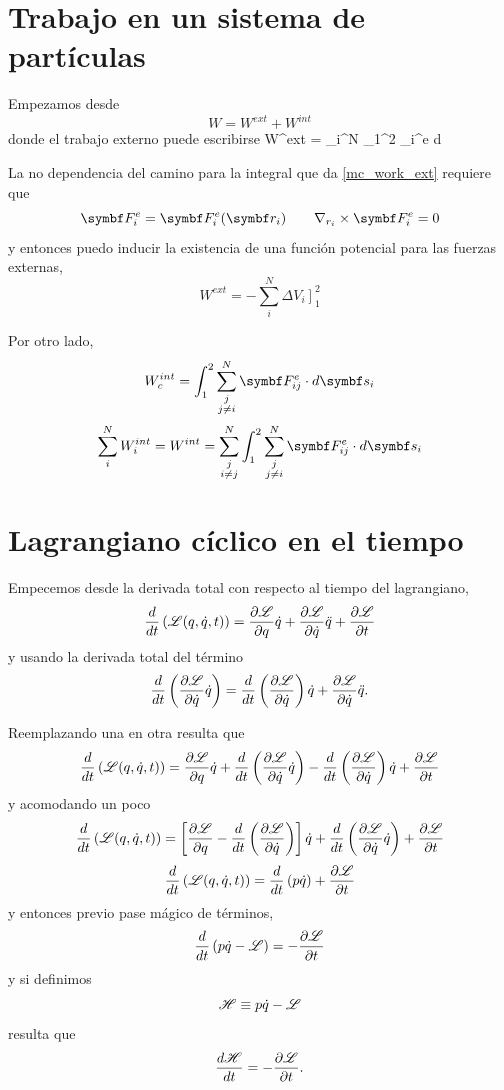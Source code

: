 \documentclass[10pt,oneside]{CBFT_book}
\begin{document}
\section{Trabajo en un sistema de partículas}

Empezamos desde
\[
	W = W^{ext} + W^{int}
\]
donde el trabajo externo puede escribirse
\be
	W^{ext} = \sum_i^N \int_1^2 _i^e \cdot d
\label{mc_work_ext}
\ee

La no dependencia del camino para la integral que da \eqref{mc_work_ext} requiere que 
\[
	\vb{F}_i^e = \vb{F}_i^e( \vb{r}_i ) \qquad \nabla_{r_i} \times \vb{F}_i^e = 0
\]
y entonces puedo inducir la existencia de una función potencial para las fuerzas externas,
\[
	W^{ext} = - \sum_i^N  \left. \Delta V_i \right]_1^2 
\]

Por otro lado,
\[
	W^{int}_c = \int_1^2 \sum_{\substack{j\\j\neq i}}^N  \vb{F}_{ij}^e \cdot d\vb{s}_i  
\]
\[
	\sum_i^N W_i^{int} =  W^{int} = \sum_{\substack{j \\ i\neq j}}^N  
	\int_1^2 \sum_{\substack{j \\ j\neq i}}^N  \vb{F}_{ij}^e \cdot d\vb{s}_i  
\]

\section{Lagrangiano cíclico en el tiempo}

Empecemos desde la derivada total con respecto al tiempo del lagrangiano,
\[
	\frac{d}{dt}\left( \Lag( q, \dot{q}, t)\right) =
	\dpar{\Lag}{q} \dot{q} + \dpar{\Lag}{\dot{q}} \ddot{q} + \dpar{\Lag}{t}
\]
y usando la derivada total del término 
\[
	\frac{d}{dt}\left( \dpar{\Lag}{\dot{q}}\dot{q}\right) =
	\frac{d}{dt}\left( \dpar{\Lag}{\dot{q}} \right) \dot{q} + \dpar{\Lag}{\dot{q}} \ddot{q} .
\]

Reemplazando una en otra resulta que 
\[
	\frac{d}{dt}\left( \Lag( q, \dot{q}, t)\right) = \dpar{\Lag}{q} \dot{q} + \frac{d}{dt}\left( 
	\dpar{\Lag}{\dot{q}}\dot{q}\right) - \frac{d}{dt}\left( \dpar{\Lag}{\dot{q}} \right) \dot{q} + \dpar{\Lag}{t}
\]
y acomodando un poco
\[
	\frac{d}{dt}\left( \Lag( q, \dot{q}, t)\right) = 
	\left[ \dpar{\Lag}{q}  - \frac{d}{dt}\left( \dpar{\Lag}{\dot{q}} \right) \right] \dot{q} + 
	\frac{d}{dt}\left( \dpar{\Lag}{\dot{q}}\dot{q}\right)  + \dpar{\Lag}{t}
\]
\[
	\frac{d}{dt}\left( \Lag( q, \dot{q}, t)\right) = \frac{d}{dt}\left( p \dot{q} \right) + \dpar{\Lag}{t}
\]
y entonces previo pase mágico de términos,
\[
	\frac{d}{dt}\left( p\dot{q} - \Lag \right) = -\dpar{\Lag}{t}
\]
y si definimos
\[
	\Ham \equiv p\dot{q} - \Lag 
\]
resulta que 
\[
	\dtot{\Ham}{t} = - \dpar{\Lag}{t}.
\]
\end{document}
